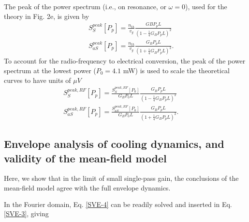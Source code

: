The peak of the power spectrum (i.e., on resonance, or $\omega = 0$), used for the theory in Fig. 2e, is given by
\begin{eqnarray}
   && S^{peak}_S[P_p] = \frac{n_{th}}{v_g} \frac{GB P_p L}{(1-\frac{1}{4} G_B P_p L)^2}
    \\
   && S^{peak}_{aS}[P_p] = \frac{n_{th}}{v_g} \frac{G_B P_p L}{(1+\frac{1}{4} G_B P_p L)^2}.
\end{eqnarray}
To account for the radio-frequency to electrical conversion, the peak of the power spectrum at the lowest power ($P_0 = 4.1$ mW) is used to scale the theoretical curves to have units of $\mu V$
\begin{eqnarray}
    && S^{peak,RF}_S[P_p] = \frac{S^{peak,RF}_S[P_0]}{G_B P_0 L} \frac{G_B P_p L}{(1-\frac{1}{4} G_B P_p L)^2} \quad \quad
    \\
   && S^{peak,RF}_{aS}[P_p] = \frac{S^{peak,RF}_{aS}[P_0]}{G_B P_0 L} \frac{G_B P_p L}{(1+\frac{1}{4} G_B P_p L)^2}. \quad\quad\quad
\end{eqnarray}

\subsection{Envelope analysis of cooling dynamics, and validity of the mean-field model}
Here, we show that in the limit of small single-pass gain, the conclusions of the mean-field model agree with the full envelope dynamics.

In the Fourier domain, Eq. \eqref{SVE-4} can be readily solved and inserted in Eq. \eqref{SVE-3}, giving

